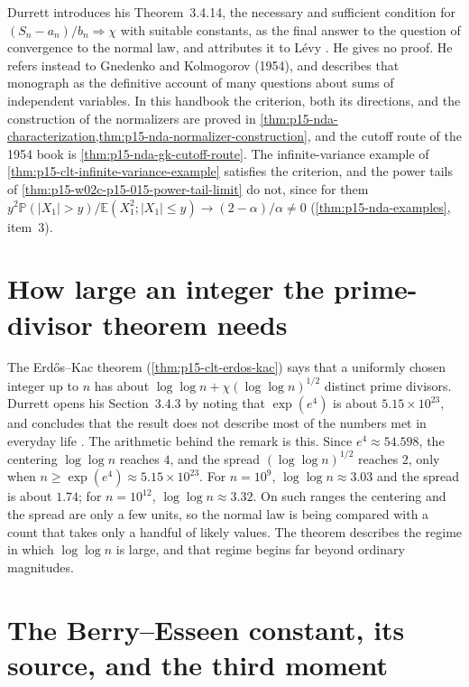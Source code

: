 Durrett introduces his Theorem~3.4.14, the necessary and sufficient
condition for \((S_n-a_n)/b_n\Rightarrow\chi\) with suitable constants,
as the final answer to the question of convergence to the normal law,
and attributes it to L\'evy \cite[p.~152]{DurrettPTEAuthor2019}. He
gives no proof. He refers instead to Gnedenko and Kolmogorov (1954), and
describes that monograph as the definitive account of many questions
about sums of independent variables. In this handbook the criterion, both its
directions, and the construction of the normalizers are proved in
\cref{thm:p15-nda-characterization,thm:p15-nda-normalizer-construction},
and the cutoff route of the 1954 book is
\cref{thm:p15-nda-gk-cutoff-route}. The infinite-variance example of
\cref{thm:p15-clt-infinite-variance-example} satisfies the criterion,
and the power tails of \cref{thm:p15-w02c-p15-015-power-tail-limit} do
not, since for them
\(y^2\mathbb P(|X_1|>y)/\mathbb E(X_1^2;|X_1|\leq y)\to(2-\alpha)/\alpha\ne0\)
(\cref{thm:p15-nda-examples}, item~3).

\section{How large an integer the prime-divisor theorem needs}
\label{sec:p15-w02c-p15-015-erdos-kac-scale}

The Erd\H{o}s--Kac theorem (\cref{thm:p15-clt-erdos-kac}) says that a
uniformly chosen integer up to \(n\) has about
\(\log\log n+\chi(\log\log n)^{1/2}\) distinct prime divisors. Durrett
opens his Section~3.4.3 by noting that \(\exp(e^4)\) is about
\(5.15\times10^{23}\), and concludes that the result does not describe
most of the numbers met in everyday life
\cite[p.~153]{DurrettPTEAuthor2019}. The arithmetic behind the remark is
this. Since \(e^4\approx54.598\), the centering \(\log\log n\) reaches
\(4\), and the spread \((\log\log n)^{1/2}\) reaches \(2\), only when
\(n\geq\exp(e^4)\approx5.15\times10^{23}\). For \(n=10^9\),
\(\log\log n\approx3.03\) and the spread is about \(1.74\); for
\(n=10^{12}\), \(\log\log n\approx3.32\). On such ranges the centering
and the spread are only a few units, so the normal law is being compared
with a count that takes only a handful of likely values. The theorem
describes the regime in which \(\log\log n\) is large, and that regime
begins far beyond ordinary magnitudes.

\section{The Berry--Esseen constant, its source, and the third moment}
\label{sec:p15-w02c-p15-015-berry-esseen-remarks}

